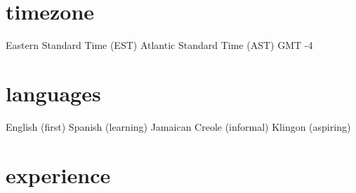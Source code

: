 \documentclass[]{friggeri-cv} %
\begin{document}
\begin{aside}
\section{timezone}
Eastern Standard Time (EST)
Atlantic Standard Time (AST)
GMT -4
\section{languages}
English (first)
Spanish (learning)
Jamaican Creole (informal)
Klingon (aspiring)
\end{aside}


\section{experience}
\end{document}
